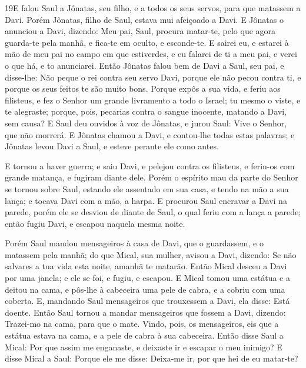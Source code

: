 \medskip

\lettrine{19} E falou Saul a Jônatas, seu filho, e a todos os
seus servos, para que matassem a Davi. Porém Jônatas, filho de Saul,
estava mui afeiçoado a Davi. E Jônatas o anunciou a Davi,
dizendo: Meu pai, Saul, procura matar-te, pelo que agora guarda-te
pela manhã, e fica-te em oculto, e esconde-te. E sairei eu, e
estarei à mão de meu pai no campo em que estiverdes, e eu falarei de
ti a meu pai, e verei o que há, e to anunciarei. Então Jônatas
falou bem de Davi a Saul, seu pai, e disse-lhe: Não peque o rei
contra seu servo Davi, porque ele não pecou contra ti, e porque os
seus feitos te são muito bons. Porque expôs a sua vida, e feriu
aos filisteus, e fez o Senhor um grande livramento a todo o Israel;
tu mesmo o viste, e te alegraste; porque, pois, pecarias contra o
sangue inocente, matando a Davi, sem causa? E Saul deu ouvidos à
voz de Jônatas, e jurou Saul: Vive o Senhor, que não morrerá. E
Jônatas chamou a Davi, e contou-lhe todas estas palavras; e Jônatas
levou Davi a Saul, e esteve perante ele como antes.

E tornou a haver guerra; e saiu Davi, e pelejou contra os
filisteus, e feriu-os com grande matança, e fugiram diante dele.
Porém o espírito mau da parte do Senhor se tornou sobre Saul,
estando ele assentado em sua casa, e tendo na mão a sua lança; e
tocava Davi com a mão, a harpa. E procurou Saul encravar a
Davi na parede, porém ele se desviou de diante de Saul, o qual feriu
com a lança a parede; então fugiu Davi, e escapou naquela mesma
noite.

Porém Saul mandou mensageiros à casa de Davi, que o guardassem, e
o matassem pela manhã; do que Mical, sua mulher, avisou a Davi,
dizendo: Se não salvares a tua vida esta noite, amanhã te matarão.
Então Mical desceu a Davi por uma janela; e ele se foi, e
fugiu, e escapou. E Mical tomou uma estátua e a deitou na
cama, e pôs-lhe à cabeceira uma pele de cabra, e a cobriu com uma
coberta. E, mandando Saul mensageiros que trouxessem a Davi,
ela disse: Está doente. Então Saul tornou a mandar
mensageiros que fossem a Davi, dizendo: Trazei-mo na cama, para que
o mate. Vindo, pois, os mensageiros, eis que a estátua estava
na cama, e a pele de cabra à sua cabeceira. Então disse Saul
a Mical: Por que assim me enganaste, e deixaste ir e escapar o meu
inimigo? E disse Mical a Saul: Porque ele me disse: Deixa-me ir, por
que hei de eu matar-te?

